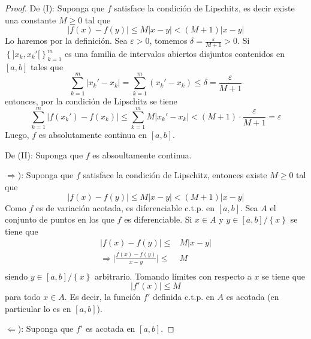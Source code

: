 \documentclass[12pt]{report}
\theoremstyle{largebreak}
\newcommand\abs[1]{\ensuremath{\lvert#1\rvert}}
\begin{document}
    \begin{proof}
        De (I): Suponga que $f$ satisface la condición de Lipschitz, es decir existe una constante $M\geq0$ tal que
        \begin{equation*}
            \abs{f(x)-f(y)}\leq M\abs{x-y}<(M+1)\abs{x-y}
        \end{equation*}
        Lo haremos por la definición. Sea $\varepsilon>0$, tomemos $\delta=\frac{\varepsilon}{M+1}>0$. Si $\left\{]x_k,x_k'[\right\}_{k=1}^{m}$ es una familia de intervalos abiertos disjuntos contenidos en $[a,b]$ tales que
        \begin{equation*}
            \sum_{k=1}^{m}\abs{x_k'-x_k}=\sum_{k=1}^{m}(x_k'-x_k)\leq\delta =\frac{\varepsilon}{M+1}
        \end{equation*}
        entonces, por la condición de Lipschitz se tiene
        \begin{equation*}
            \sum_{k=1}^{m}\abs{f(x_k')-f(x_k)}\leq\sum_{k=1}^{m}M\abs{x_k'-x_k}<(M+1)\cdot\frac{\varepsilon}{M+1}=\varepsilon
        \end{equation*}
        Luego, $f$ es absolutamente continua en $[a,b]$.

        De (II): Suponga que $f$ es absoultamente continua.

        $\Rightarrow$): Suponga que $f$ satisface la condición de Lipschitz, entonces existe $M\geq0$ tal que
        \begin{equation*}
            \abs{f(x)-f(y)}\leq M\abs{x-y}<(M+1)\abs{x-y}
        \end{equation*}
        Como $f$ es de variación acotada, es diferenciable c.t.p. en $[a,b]$. Sea $A$ el conjunto de puntos en los que $f$ es diferenciable. Si $x\in A$ y $y\in[a,b]/\left\{x\right\}$ se tiene que
        \begin{equation*}
            \begin{split}
                \abs{f(x)-f(y)}\leq &M\abs{x-y}\\
                \Rightarrow \abs{\frac{f(x)-f(y)}{x-y}}\leq&M\\
            \end{split}
        \end{equation*}
        siendo $y\in[a,b]/\left\{x\right\}$ arbitrario. Tomando límites con respecto a $x$ se tiene que
        \begin{equation*}
            \abs{f'(x)}\leq M
        \end{equation*}
        para todo $x\in A$. Es decir, la función $f'$ definida c.t.p. en $A$ es acotada (en particular lo es en $[a,b]$).

        $\Leftarrow$): Suponga que $f'$ es acotada en $[a,b]$. 


    \end{proof}
\end{document}
